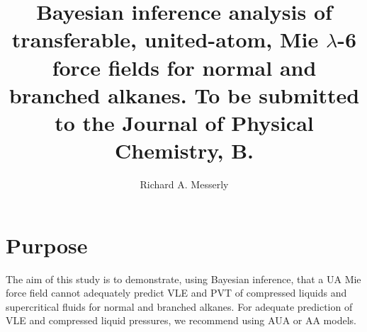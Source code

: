 \documentclass[preprint,letterpaper,floatfix,citeautoscript,aip,jcp]{revtex4-1}
\begin{document}
\title{Bayesian inference analysis of transferable, united-atom, Mie $\lambda$-6 force fields for normal and branched alkanes. To be submitted to the Journal of Physical Chemistry, B.}
\author{Richard A. Messerly}


\begin{abstract}

\end{abstract}

\maketitle

\section*{Purpose}

The aim of this study is to demonstrate, using Bayesian inference, that a UA Mie force field cannot adequately predict VLE and PVT of compressed liquids and supercritical fluids for normal and branched alkanes. For adequate prediction of VLE and compressed liquid pressures, we recommend using AUA or AA models. %
\end{document}
